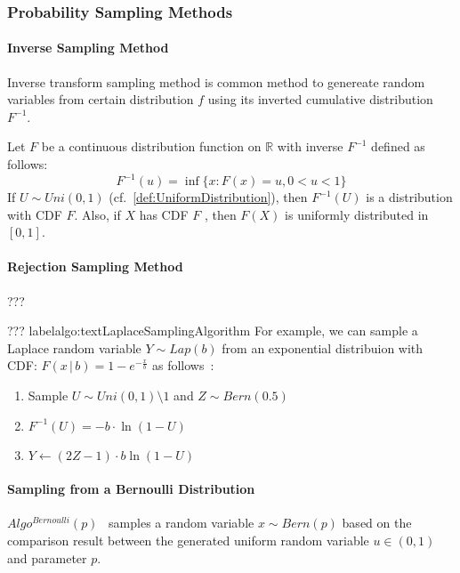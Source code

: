 \subsubsection{Probability Sampling Methods}
\label{subsec:ProbabilitySamplingMethods}

\paragraph{Inverse Sampling Method}
Inverse transform sampling method is common method to genereate random variables from certain distribution $f$ using its inverted cumulative distribution $F^{-1}$.
\begin{theorem}
    \label{theorem:inversionSamplingMethod}
    Let $F$ be a continuous distribution function on $\mathbb{R}$ with inverse $F^{-1}$ defined as follows:
    \begin{equation}
        F^{-1}\left( u\right) =\inf \{ x:F\left( x\right) =u,0 <u < 1\}
    \end{equation}
    If $U\sim Uni\left( 0,1\right)$ (cf.~\autoref{def:UniformDistribution}), then $F^{-1}\left( U\right)$ is a distribution with CDF $F$. Also, if $X$ has CDF $F$ , then $F\left( X\right) $ is uniformly distributed in $\left[0,1\right]  $.
\end{theorem}

\paragraph{Rejection Sampling Method}
???


???
label{algo:textLaplaceSamplingAlgorithm}
For example, we can sample a Laplace random variable $Y\sim Lap\left(b\right) $ from an exponential distribuion with CDF: $F\left(x\,|\, b\right) =1-e^{-\frac{x}{b}}$ as follows~\cite[Chapter 3.4]{knuth2014art}:
\begin{enumerate}
    \item Sample $U\sim Uni\left(0,1\right)\setminus 1 $ and $Z \sim Bern\left(0.5\right) $
    \item $  F^{-1}\left(U\right) =-b \cdot \ln\left(1-U\right)  $
    \item $ Y\gets \left(2Z-1\right)\cdot b \ln\left(1-U\right) $
\end{enumerate}

\paragraph{Sampling from a Bernoulli Distribution}
$Algo^{Bernoulli}\left(p\right)$~\cite{knott2021crypten} samples a random variable $x\sim Bern\left(p\right) $ based on the comparison result between the generated uniform random variable $u \in \left(0,1\right) $ and parameter $p$.

